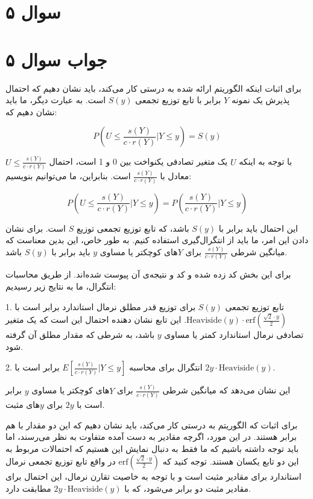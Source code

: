 \section*{سوال ۵}


\section*{جواب سوال ۵}

برای اثبات اینکه الگوریتم ارائه شده به درستی کار می‌کند، باید نشان دهیم که احتمال پذیرش یک نمونه \( Y \) برابر با تابع توزیع تجمعی \( S(y) \) است. به عبارت دیگر، ما باید نشان دهیم که:

\[ P(U \leq \frac{s(Y)}{c \cdot r(Y)} | Y \leq y) = S(y) \]

با توجه به اینکه \( U \) یک متغیر تصادفی یکنواخت بین 0 و 1 است، احتمال \( U \leq \frac{s(Y)}{c \cdot r(Y)} \) معادل با \( \frac{s(Y)}{c \cdot r(Y)} \) است. بنابراین، ما می‌توانیم بنویسیم:

\[ P(U \leq \frac{s(Y)}{c \cdot r(Y)} | Y \leq y) = P(\frac{s(Y)}{c \cdot r(Y)} | Y \leq y) \]

این احتمال باید برابر با \( S(y) \) باشد، که تابع توزیع تجمعی توزیع \( S \) است. برای نشان دادن این امر، ما باید از انتگرال‌گیری استفاده کنیم. به طور خاص، این بدین معناست که میانگین شرطی \( \frac{s(Y)}{c \cdot r(Y)} \) برای \( Y \)‌های کوچکتر یا مساوی \( y \) باید برابر با \( S(y) \) باشد.

برای این بخش کد زده شده و کد و نتیجه‌ی آن پیوست شده‌اند. از طریق محاسبات انتگرال، ما به نتایج زیر رسیدیم:

1. تابع توزیع تجمعی \( S(y) \) برای توزیع قدر مطلق نرمال استاندارد برابر است با 
\( \text{Heaviside}(y) \cdot \text{erf}\left(\frac{\sqrt{2} \cdot y}{2}\right) \).
این تابع نشان دهنده احتمال این است که یک متغیر تصادفی نرمال استاندارد کمتر یا مساوی \( y \) باشد، به شرطی که مقدار مطلق آن گرفته شود.

2. انتگرال برای محاسبه \( E\left[\frac{s(Y)}{c \cdot r(Y)} | Y \leq y\right] \) برابر است با \( 2y \cdot \text{Heaviside}(y) \).

این نشان می‌دهد که میانگین شرطی \( \frac{s(Y)}{c \cdot r(Y)} \) برای \( Y \)‌های کوچکتر یا مساوی \( y \) برابر است با \( 2y \) برای \( y \)‌های مثبت.

برای اثبات که الگوریتم به درستی کار می‌کند، باید نشان دهیم که این دو مقدار با هم برابر هستند. در این مورد، اگرچه مقادیر به دست آمده متفاوت به نظر می‌رسند، اما باید توجه داشته باشیم که ما فقط به دنبال نمایش این هستیم که احتمالات مربوط به این دو تابع یکسان هستند. توجه کنید که \( \text{erf}\left(\frac{\sqrt{2} \cdot y}{2}\right) \) در واقع تابع توزیع تجمعی نرمال استاندارد برای مقادیر مثبت است و با توجه به خاصیت تقارن نرمال، این احتمال برای مقادیر مثبت دو برابر می‌شود، که با \( 2y \cdot \text{Heaviside}(y) \) مطابقت دارد.

